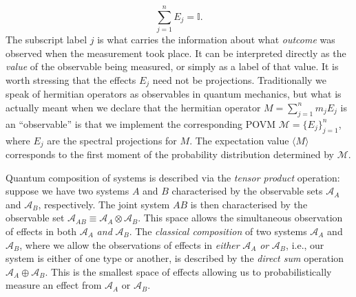 \documentclass[11pt]{amsart}
\theoremstyle{plain}%
\theoremstyle{definition}
\theoremstyle{remark}
\begin{document}
\begin{equation}
	\sum_{j=1}^n E_j = \mathbb{I}.
\end{equation}
The subscript label $j$ is what carries the information about what \emph{outcome} was observed when the measurement took place. It can be interpreted directly as the \emph{value} of the observable being measured, or simply as a label of that value. It is worth stressing that the effects $E_j$ need not be projections. Traditionally we speak of hermitian operators as observables in quantum mechanics, but what is actually meant when we declare that the hermitian operator $M = \sum_{j=1}^n m_j E_j$ is an ``observable'' is that we implement the corresponding POVM  $\mathcal{M} = \{E_j\}_{j=1}^n$, where $E_j$ are the spectral projections for $M$. The expectation value $\langle M \rangle$ corresponds to the first moment of the probability distribution determined by $\mathcal{M}$.

Quantum composition of systems is described via the \emph{tensor product} operation: suppose we have two systems $A$ and $B$ characterised by the observable sets $\mathcal{A}_A$ and $\mathcal{A}_B$, respectively. The joint system $AB$ is then characterised by the observable set $\mathcal{A}_{AB} \equiv \mathcal{A}_A\otimes \mathcal{A}_B$. This space allows the simultaneous observation of effects in both $\mathcal{A}_A$ \emph{and} $\mathcal{A}_B$. The \emph{classical composition} of two systems $\mathcal{A}_A$ and $\mathcal{A}_B$, where we allow the observations of effects in \emph{either}  $\mathcal{A}_A$ \emph{or} $\mathcal{A}_B$, i.e., our system is either of one type or another, is described by the \emph{direct sum} operation $\mathcal{A}_{A}\oplus \mathcal{A}_B$. This is the smallest space of effects allowing us to probabilistically measure an effect from  $\mathcal{A}_A$ or $\mathcal{A}_B$.
\end{document}
